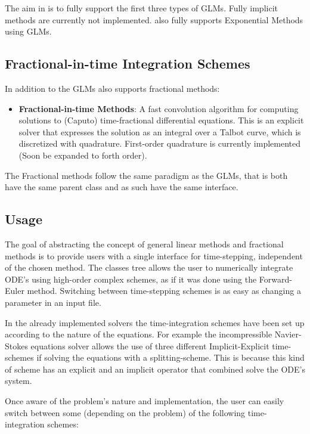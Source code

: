 The aim in {\nek} is to fully support the first three types of GLMs.
Fully implicit methods are currently not implemented. {\nek} also
fully supports Exponential Methods using GLMs.

\subsection{Fractional-in-time Integration Schemes}

In addition to the GLMs {\nek} also supports fractional methods:
\begin{itemize}
  \item \textbf{Fractional-in-time Methods}: A fast convolution
    algorithm for computing solutions to (Caputo) time-fractional
    differential equations. This is an explicit solver that expresses
    the solution as an integral over a Talbot curve, which is
    discretized with quadrature. First-order quadrature is currently
    implemented (Soon be expanded to forth order).
\end{itemize}

The Fractional methods follow the same paradigm as the GLMs, that is
both have the same parent class and as such have the same interface.

\subsection{Usage}
The goal of abstracting the concept of general linear methods and
fractional methods is to provide users with a single interface for
time-stepping, independent of the chosen method. The classes tree
allows the user to numerically integrate ODE's using high-order
complex schemes, as if it was done using the Forward-Euler method.
Switching between time-stepping schemes is as easy as changing a
parameter in an input file.

In the already implemented solvers the time-integration schemes have
been set up according to the nature of the equations.  For example the
incompressible Navier-Stokes equations solver allows the use of three
different Implicit-Explicit time-schemes if solving the equations with
a splitting-scheme.  This is because this kind of scheme has an
explicit and an implicit operator that combined solve the ODE's
system.

Once aware of the problem's nature and implementation, the user can
easily switch between some (depending on the problem) of the following
time-integration schemes:

